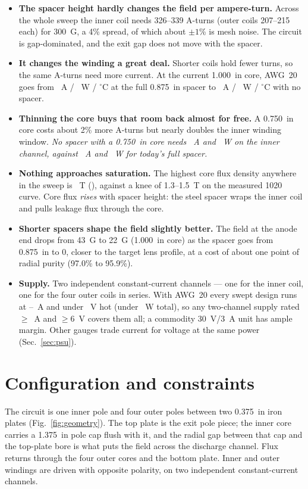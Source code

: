 \documentclass[10pt]{article}
\begin{document}
\begin{itemize}
\item \textbf{The spacer height hardly changes the field per ampere-turn.} Across the whole sweep the inner coil needs 326--339 A-turns (outer coils 207--215 each) for 300~G, a 4\% spread, of which about $\pm1$\% is mesh noise. The circuit is gap-dominated, and the exit gap does not move with the spacer.
\item \textbf{It changes the winding a great deal.} Shorter coils hold fewer turns, so the same A-turns need more current. At the current 1.000~in core, AWG~20 goes from \BaseI~A / \BaseP~W / \BaseT$^\circ$C at the full 0.875~in spacer to \ZeroI~A / \ZeroP~W / \ZeroT$^\circ$C with no spacer.
\item \textbf{Thinning the core buys that room back almost for free.} A 0.750~in core costs about 2\% more A-turns but nearly doubles the inner winding window. \emph{No spacer with a 0.750~in core needs \ZeroThinI~A and \ZeroThinP~W on the inner channel, against \BaseI~A and \BaseP~W for today's full spacer.}
\item \textbf{Nothing approaches saturation.} The highest core flux density anywhere in the sweep is \WorstCoreB~T (\WorstCoreDesc), against a knee of 1.3--1.5~T on the measured 1020 curve. Core flux \emph{rises} with spacer height: the steel spacer wraps the inner coil and pulls leakage flux through the core.
\item \textbf{Shorter spacers shape the field slightly better.} The field at the anode end drops from 43~G to 22~G (1.000~in core) as the spacer goes from 0.875~in to 0, closer to the target lens profile, at a cost of about one point of radial purity (97.0\% to 95.9\%).
\item \textbf{Supply.} Two independent constant-current channels --- one for the inner coil, one for the four outer coils in series. With AWG~20 every swept design runs at \PsuIMin--\PsuIMax~A and under \PsuVMax~V hot (under \PsuPMax~W total), so any two-channel supply rated $\geq$\PsuIRate~A and $\geq$6~V covers them all; a commodity 30~V/3~A unit has ample margin. Other gauges trade current for voltage at the same power (Sec.~\ref{sec:psu}).
\end{itemize}

\section{Configuration and constraints}
\label{sec:config}

The circuit is one inner pole and four outer poles between two 0.375~in iron plates (Fig.~\ref{fig:geometry}). The top plate is the exit pole piece; the inner core carries a 1.375~in pole cap flush with it, and the radial gap between that cap and the top-plate bore is what puts the field across the discharge channel. Flux returns through the four outer cores and the bottom plate. Inner and outer windings are driven with opposite polarity, on two independent constant-current channels.
\end{document}
